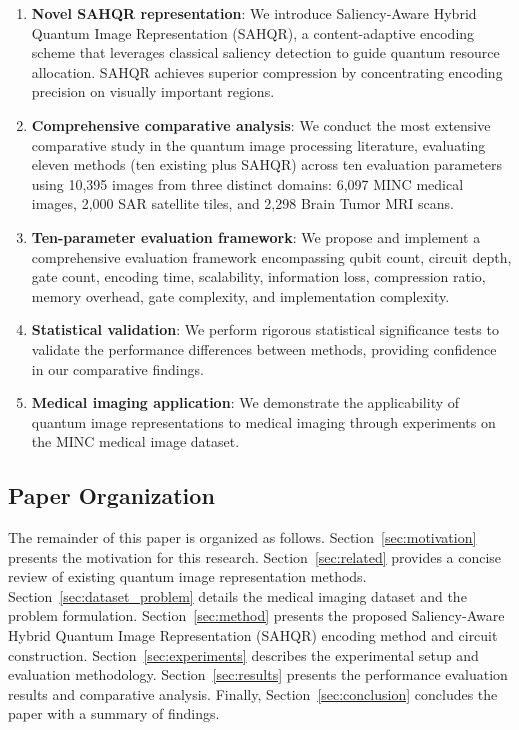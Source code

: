 \documentclass{ipol}
\begin{document}
\begin{enumerate}
\item \textbf{Novel SAHQR representation}: We introduce Saliency-Aware Hybrid Quantum Image Representation (SAHQR), a content-adaptive encoding scheme that leverages classical saliency detection to guide quantum resource allocation. SAHQR achieves superior compression by concentrating encoding precision on visually important regions.

\item \textbf{Comprehensive comparative analysis}: We conduct the most extensive comparative study in the quantum image processing literature, evaluating eleven methods (ten existing plus SAHQR) across ten evaluation parameters using 10,395 images from three distinct domains: 6,097 MINC medical images, 2,000 SAR satellite tiles, and 2,298 Brain Tumor MRI scans.

\item \textbf{Ten-parameter evaluation framework}: We propose and implement a comprehensive evaluation framework encompassing qubit count, circuit depth, gate count, encoding time, scalability, information loss, compression ratio, memory overhead, gate complexity, and implementation complexity.

\item \textbf{Statistical validation}: We perform rigorous statistical significance tests to validate the performance differences between methods, providing confidence in our comparative findings.

\item \textbf{Medical imaging application}: We demonstrate the applicability of quantum image representations to medical imaging through experiments on the MINC medical image dataset.
\end{enumerate}

\subsection{Paper Organization}

The remainder of this paper is organized as follows. Section~\ref{sec:motivation} presents the motivation for this research. Section~\ref{sec:related} provides a concise review of existing quantum image representation methods. Section~\ref{sec:dataset_problem} details the medical imaging dataset and the problem formulation. Section~\ref{sec:method} presents the proposed Saliency-Aware Hybrid Quantum Image Representation (SAHQR) encoding method and circuit construction. Section~\ref{sec:experiments} describes the experimental setup and evaluation methodology. Section~\ref{sec:results} presents the performance evaluation results and comparative analysis. Finally, Section~\ref{sec:conclusion} concludes the paper with a summary of findings.
\end{document}
